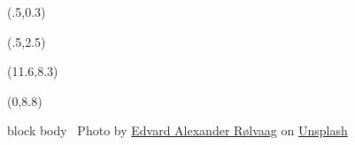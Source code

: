 {
\begin{textblock}{10.5}(.5,0.3)
\fontsize{28}{40}\selectfont\bfseries\sffamily\textcolor[RGB]{204,89,0}{\inserttitle}\\[0.3cm]
\fontsize{12}{12}\selectfont\bfseries\sffamily\textcolor[RGB]{204,89,0}{\insertsubtitle}
\end{textblock}
\begin{textblock}{7.5}(.5,2.5)
\fontsize{13}{13}\selectfont\sffamily\textcolor[RGB]{80,70,60}{\insertauthor}
\end{textblock}
\begin{textblock}{4.2}(11.6,8.3)
\end{textblock}
\begin{textblock}{6.2}(0,8.8)
\begin{beamercolorbox}[wd=4.7cm]{block body}
\fontsize{6}{6}\sf\color[RGB]{72,45,34}~Photo by \href{https://unsplash.com/@edvardr?utm_source=unsplash&amp;utm_medium=referral&amp;utm_content=creditCopyText}{Edvard Alexander Rølvaag} on \href{https://unsplash.com/s/photos/hierarchy?utm_source=unsplash&amp;utm_medium=referral&amp;utm_content=creditCopyText}{Unsplash}
\end{beamercolorbox}
\end{textblock}}



\usepackage{tikz}
\usepackage{forest}

\usetikzlibrary{trees,shapes,arrows,matrix,shadows,positioning}
\usetikzlibrary{decorations.pathreplacing, arrows, calc, fit, arrows.meta, decorations.pathmorphing, decorations.markings}


